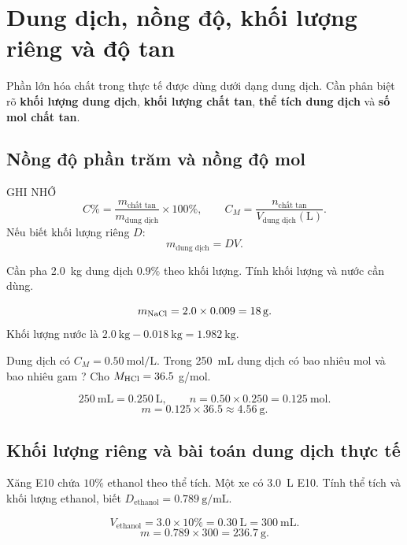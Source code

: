 \section{Dung dịch, nồng độ, khối lượng riêng và độ tan}

Phần lớn hóa chất trong thực tế được dùng dưới dạng dung dịch. Cần phân biệt rõ \textbf{khối lượng dung dịch}, \textbf{khối lượng chất tan}, \textbf{thể tích dung dịch} và \textbf{số mol chất tan}.

\subsection{Nồng độ phần trăm và nồng độ mol}
\begin{ghinho}{GHI NHỚ}
\[
C\%=\frac{m_{\text{chất tan}}}{m_{\text{dung dịch}}}\times100\%,
\qquad
C_M=\frac{n_{\text{chất tan}}}{V_{\text{dung dịch}}(\si{\liter})}.
\]
Nếu biết khối lượng riêng \(D\):
\[
m_{\text{dung dịch}}=DV.
\]
\end{ghinho}

\begin{vidu}
Cần pha \SI{2.0}{\kilo\gram} dung dịch  \(0.9\%\) theo khối lượng. Tính khối lượng  và nước cần dùng.
\end{vidu}
\begin{loigiai}
\[
m_{\ce{NaCl}}=2.0\times0.009=\SI{18}{\gram}.
\]
Khối lượng nước là \(\SI{2.0}{\kilo\gram}-\SI{0.018}{\kilo\gram}=\SI{1.982}{\kilo\gram}\).
\end{loigiai}

\begin{vidu}
Dung dịch  có \(C_M=\SI{0.50}{\mole\per\liter}\). Trong \SI{250}{\milli\liter} dung dịch có bao nhiêu mol và bao nhiêu gam ? Cho \(M_{\ce{HCl}}=36.5\) g/mol.
\end{vidu}
\begin{loigiai}
\[
\SI{250}{\milli\liter}=\SI{0.250}{\liter},\qquad
n=0.50\times0.250=\SI{0.125}{\mole}.
\]
\[
m=0.125\times36.5\approx\SI{4.56}{\gram}.
\]
\end{loigiai}

\subsection{Khối lượng riêng và bài toán dung dịch thực tế}
\begin{vidu}
Xăng E10 chứa \(10\%\) ethanol theo thể tích. Một xe có \SI{3.0}{\liter} E10. Tính thể tích và khối lượng ethanol, biết \(D_{\text{ethanol}}=\SI{0.789}{\gram\per\milli\liter}\).
\end{vidu}
\begin{loigiai}
\[
V_{\text{ethanol}}=3.0\times10\%=\SI{0.30}{\liter}=\SI{300}{\milli\liter}.
\]
\[
m=0.789\times300=\SI{236.7}{\gram}.
\]
\end{loigiai}

